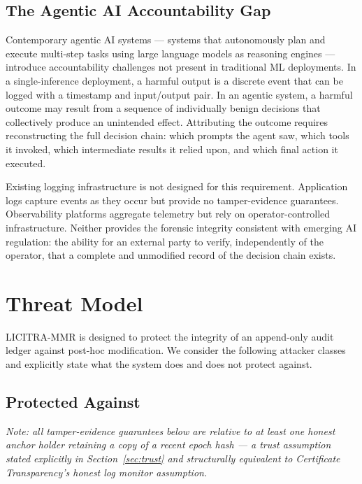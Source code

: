 \documentclass[sigconf,natbib=false]{acmart}
\begin{document}
\subsection{The Agentic AI Accountability Gap}

Contemporary agentic AI systems --- systems that autonomously plan and
execute multi-step tasks using large language models as reasoning engines
--- introduce accountability challenges not present in traditional ML
deployments. In a single-inference deployment, a harmful output is a
discrete event that can be logged with a timestamp and input/output pair.
In an agentic system, a harmful outcome may result from a sequence of
individually benign decisions that collectively produce an unintended
effect. Attributing the outcome requires reconstructing the full decision
chain: which prompts the agent saw, which tools it invoked, which
intermediate results it relied upon, and which final action it executed.

Existing logging infrastructure is not designed for this requirement.
Application logs capture events as they occur but provide no
tamper-evidence guarantees. Observability platforms aggregate telemetry
but rely on operator-controlled infrastructure. Neither provides the
forensic integrity consistent with emerging AI regulation: the ability for
an external party to verify, independently of the operator, that a complete
and unmodified record of the decision chain exists.

\section{Threat Model}

LICITRA-MMR is designed to protect the integrity of an append-only audit
ledger against post-hoc modification. We consider the following attacker
classes and explicitly state what the system does and does not protect
against.

\subsection{Protected Against}

\textit{Note: all tamper-evidence guarantees below are relative to at least
one honest anchor holder retaining a copy of a recent epoch hash --- a
trust assumption stated explicitly in Section~\ref{sec:trust} and
structurally equivalent to Certificate Transparency's honest log monitor
assumption.}
\end{document}

